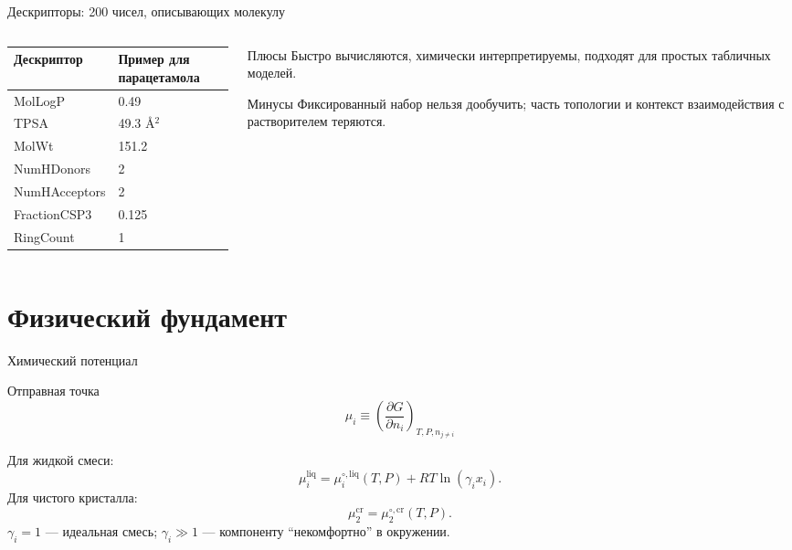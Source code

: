\documentclass[aspectratio=169,10pt]{beamer}
\newcommand{\smallnote}[1]{{\scriptsize\color{TGSlate}#1}}
\begin{document}
\begin{frame}{Дескрипторы: 200 чисел, описывающих молекулу}
  \small
  \begin{columns}[T,onlytextwidth]
    \begin{column}{0.50\textwidth}
      \begin{tabular}{ll}
        \toprule
        \textbf{Дескриптор} & \textbf{Пример для парацетамола}\\
        \midrule
        MolLogP & 0.49\\
        TPSA & 49.3 \AA$^2$\\
        MolWt & 151.2\\
        NumHDonors & 2\\
        NumHAcceptors & 2\\
        FractionCSP3 & 0.125\\
        RingCount & 1\\
        \bottomrule
      \end{tabular}
    \end{column}
    \begin{column}{0.44\textwidth}
      \begin{block}{Плюсы}
        \scriptsize
        Быстро вычисляются, химически интерпретируемы, подходят для простых табличных моделей.
      \end{block}
      \begin{block}{Минусы}
        \scriptsize
        Фиксированный набор нельзя дообучить; часть топологии и контекст взаимодействия с растворителем теряются.
      \end{block}
    \end{column}
  \end{columns}
\end{frame}

\section{Физический фундамент}

\begin{frame}{Химический потенциал}
  \small
  \begin{block}{Отправная точка}
    \[
      \mu_i\equiv\left(\frac{\partial G}{\partial n_i}\right)_{T,P,n_{j\neq i}}
    \]
  \end{block}
  Для жидкой смеси:
  \[
    \mu_i^{\mathrm{liq}}=\mu_i^{\circ,\mathrm{liq}}(T,P)+RT\ln(\gamma_i x_i).
  \]
  Для чистого кристалла:
  \[
    \mu_2^{\mathrm{cr}}=\mu_2^{\circ,\mathrm{cr}}(T,P).
  \]
  \smallnote{$\gamma_i=1$ — идеальная смесь; $\gamma_i\gg1$ — компоненту ``некомфортно'' в окружении.}
\end{frame}
\end{document}
